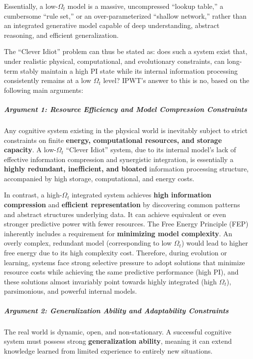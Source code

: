 \documentclass[
  a4paper]{article}
\begin{document}
Essentially, a low-\(\Omega_t\) model is a massive, uncompressed
``lookup table,'' a cumbersome ``rule set,'' or an over-parameterized
``shallow network,'' rather than an integrated generative model capable
of deep understanding, abstract reasoning, and efficient generalization.

The ``Clever Idiot'' problem can thus be stated as: does such a system
exist that, under realistic physical, computational, and evolutionary
constraints, can long-term stably maintain a high PI state while its
internal information processing consistently remains at a low
\(\Omega_t\) level? IPWT's answer to this is no, based on the following
main arguments:

\subparagraph{Argument 1: Resource Efficiency and Model Compression
Constraints}\label{argument-1-resource-efficiency-and-model-compression-constraints}

Any cognitive system existing in the physical world is inevitably
subject to strict constraints on finite \textbf{energy, computational
resources, and storage capacity}. A low-\(\Omega_t\) ``Clever Idiot''
system, due to its internal model's lack of effective information
compression and synergistic integration, is essentially a \textbf{highly
redundant, inefficient, and bloated} information processing structure,
accompanied by high storage, computational, and energy costs.

In contrast, a high-\(\Omega_t\) integrated system achieves \textbf{high
information compression} and \textbf{efficient representation} by
discovering common patterns and abstract structures underlying data. It
can achieve equivalent or even stronger predictive power with fewer
resources. The Free Energy Principle (FEP) inherently includes a
requirement for \textbf{minimizing model complexity}. An overly complex,
redundant model (corresponding to low \(\Omega_t\)) would lead to higher
free energy due to its high complexity cost. Therefore, during evolution
or learning, systems face strong selective pressure to adopt solutions
that minimize resource costs while achieving the same predictive
performance (high PI), and these solutions almost invariably point
towards highly integrated (high \(\Omega_t\)), parsimonious, and
powerful internal models.

\subparagraph{Argument 2: Generalization Ability and Adaptability
Constraints}\label{argument-2-generalization-ability-and-adaptability-constraints}

The real world is dynamic, open, and non-stationary. A successful
cognitive system must possess strong \textbf{generalization ability},
meaning it can extend knowledge learned from limited experience to
entirely new situations.
\end{document}
